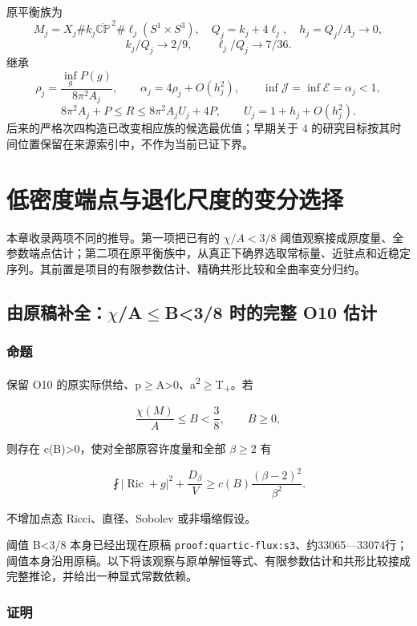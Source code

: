 \documentclass[UTF8,11pt,openany,oneside,fontset=none]{ctexbook}
\begin{document}
原平衡族为 \[
M_j=X_j\#k_j\overline{\mathbb{CP}}^{\,2}
\#\ell_j(S^1\times S^3),\quad
Q_j=k_j+4\ell_j,\quad h_j=Q_j/A_j\to0,
\] \[
k_j/Q_j\to2/9,\qquad\ell_j/Q_j\to7/36.
\] 继承 \[
\rho_j=\frac{\inf_gP(g)}{8\pi^2A_j},\qquad
\alpha_j=4\rho_j+O(h_j^2),\qquad
\inf\mathcal J=\inf\mathcal E=\alpha_j<1,
\] \[
8\pi^2A_j+P\le R\le8\pi^2A_jU_j+4P,
\qquad U_j=1+h_j+O(h_j^2).
\] 后来的严格次四构造已改变相应族的候选最优值；早期关于 \(4\) 的研究目标按其时间位置保留在来源索引中，不作为当前已证下界。\cite{Base,System}


\chapter{低密度端点与退化尺度的变分选择}\label{chapter:1}
本章收录两项不同的推导。第一项把已有的 \(\chi/A<3/8\) 阈值观察接成原度量、全参数端点估计；第二项在原平衡族中，从真正下确界选取常标量、近驻点和近稳定序列。其前置是项目的有限参数估计、精确共形比较和全曲率变分归约。\cite{R01,Base,N1}

\section{由原稿补全：\(\chi\)/A\(\le\)B\textless3/8 时的完整 O10 估计}\label{ch1:ux7531ux539fux7a3fux8865ux5168ux3c7ab38-ux65f6ux7684ux5b8cux6574-o10-ux4f30ux8ba1}

\subsection{命题}\label{ch1:ux547dux9898}

保留 O10 的原实际供给、p\(\ge\)A\textgreater0、a\textsuperscript{2}\(\ge\)T\textsubscript{+}。若

\[
\frac{\chi(M)}A\le B<\frac38,\qquad B\ge0,
\]

则存在 c(B)\textgreater0，使对全部原容许度量和全部 \(\beta\)\(\ge\)2 有

\[
\boxed{\fint|\operatorname{Ric}+g|^2+\frac{D_\beta}{V}
\ge c(B)\frac{(\beta-2)^2}{\beta^2}.}
\tag{1.1}\label{eq:r1:1}
\]

不增加点态 Ricci、直径、Sobolev 或非塌缩假设。

阈值 B\textless3/8 本身已经出现在原稿 \texttt{proof:quartic-flux:s3}、约33065---33074行；阈值本身沿用原稿。以下将该观察与原单解恒等式、有限参数估计和共形比较接成完整推论，并给出一种显式常数依赖。

\subsection{证明}\label{ch1:ux8bc1ux660e}
\end{document}
